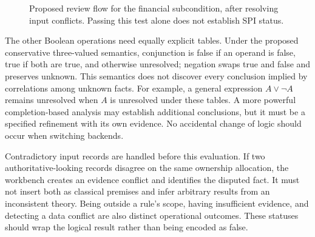 \documentclass[12pt,a4paper,oneside,openany]{book}
\begin{document}
\begin{figure}[!htbp]
\centering
{}
\caption{Proposed review flow for the financial subcondition, after resolving
input conflicts. Passing this test alone does not establish SPI status.}
\label{fig:financial-flow}
\end{figure}

The other Boolean operations need equally explicit tables. Under the proposed
conservative three-valued semantics, conjunction is false if an operand is false,
true if both are true, and otherwise unresolved; negation swaps true and false
and preserves unknown. This semantics does not discover every conclusion implied
by correlations among unknown facts. For example, a general expression
$A\lor\neg A$ remains unresolved when $A$ is unresolved under these tables.
A more powerful completion-based analysis may establish additional conclusions,
but it must be a specified refinement with its own evidence. No accidental
change of logic should occur when switching backends.

Contradictory input records are handled before this evaluation. If two
authoritative-looking records disagree on the same ownership allocation, the
workbench creates an evidence conflict and identifies the disputed fact. It must
not insert both as classical premises and infer arbitrary results from an
inconsistent theory. Being outside a rule's scope, having insufficient evidence,
and detecting a data conflict are also distinct operational outcomes. These
statuses should wrap the logical result rather than being encoded as false.
\end{document}
